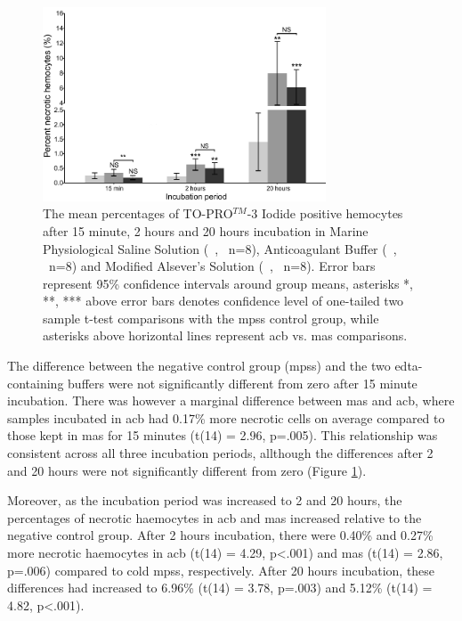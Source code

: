 \begin{figure}[!ht]
    \centering
    \includegraphics[width=0.75\textwidth]{figures/Method development/buffer viability bargraph scaled.pdf}
    \caption{The mean percentages of TO-PRO$^{TM}$-3 Iodide positive hemocytes after 15 minute, 2 hours and 20 hours incubation in Marine Physiological Saline Solution (\, \protect\lysegraabox, \ n=8), Anticoagulant Buffer (\, \protect\customgraybox, \ n=8) and Modified Alsever's Solution (\, \protect\darkgraybox, \ n=8). Error bars represent 95\% confidence intervals around group means, asterisks *, **, *** above error bars denotes confidence level of one-tailed two sample t-test comparisons with the \acrshort{mpss} control group, while asterisks above horizontal lines represent \acrshort{acb} vs. \acrshort{mas} comparisons.}
    \label{fig:BufferViability}
\end{figure}

The difference between the negative control group (\acrshort{mpss}) and the two \acrshort{edta}-containing buffers were not significantly different from zero after 15 minute incubation. There was however a marginal difference between \acrshort{mas} and \acrshort{acb}, where samples incubated in \acrshort{acb} had 0.17\% more necrotic cells on average compared to those kept in \acrshort{mas} for 15 minutes (t(14) = 2.96, p=.005). This relationship was consistent across all three incubation periods, allthough the differences after 2 and 20 hours were not significantly different from zero (Figure \ref{fig:BufferViability}).

Moreover, as the incubation period was increased to 2 and 20 hours, the percentages of necrotic haemocytes in \acrshort{acb} and \acrshort{mas} increased relative to the negative control group. After 2 hours incubation, there were 0.40\% and 0.27\% more necrotic haemocytes in \acrshort{acb} (t(14) = 4.29, p<.001) and \acrshort{mas} (t(14) = 2.86, p=.006) compared to cold \acrshort{mpss}, respectively. After 20 hours incubation, these differences had increased to 6.96\% (t(14) = 3.78, p=.003) and 5.12\% (t(14) = 4.82, p<.001).

